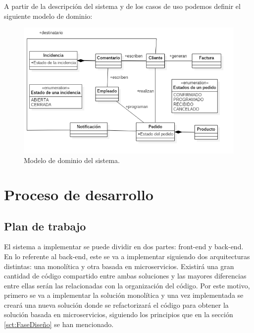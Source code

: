 \documentclass[11pt,spanish,listoffigures]{tfgetsinf}
\begin{document}
A partir de la descripción del sistema y de los casos de uso podemos definir el siguiente modelo de dominio:

\begin{figure}[h]
\centering
\includegraphics[scale=0.6]{modelo_dominio_final}
\caption{Modelo de dominio del sistema.}
\end{figure}

%

\chapter{Proceso de desarrollo}

\section{Plan de trabajo} \label{sct:PlanTrabajo}

El sistema a implementar se puede dividir en dos partes: front-end y back-end. En lo referente al back-end, este se va a implementar siguiendo dos arquitecturas distintas: una monolítica y otra basada en microservicios. Existirá una gran cantidad de código compartido entre ambas soluciones y las mayores diferencias entre ellas serán las relacionadas con la organización del código. Por este motivo, primero se va a implementar la solución monolítica y una vez implementada se creará una nueva solución donde se refactorizará el código para obtener la solución basada en microservicios, siguiendo los principios que en la sección \ref{sct:FaseDiseño}  se han mencionado.
\end{document}
